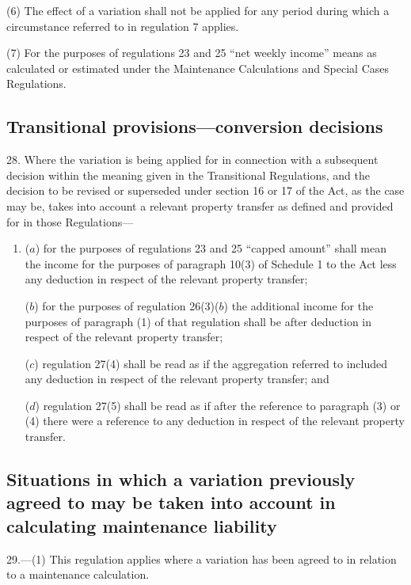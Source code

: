 \documentclass[12pt,a4paper]{article}
\begin{document}
(6) The effect of a variation shall not be applied for any period during which a circumstance referred to in regulation 7 applies.

(7) For the purposes of regulations 23 and 25 “net weekly income” means as calculated or estimated under the Maintenance Calculations and Special Cases Regulations.

\subsection[28. Transitional provisions—conversion decisions]{Transitional provisions—conversion decisions}

28.  Where the variation is being applied for in connection with a subsequent decision within the meaning given in the Transitional Regulations, and the decision to be revised or superseded under section 16 or 17 of the Act, as the case may be, takes into account a relevant property transfer as defined and provided for in those Regulations—
\begin{enumerate}\item[]
($a$) for the purposes of regulations 23 and 25 “capped amount” shall mean the income for the purposes of paragraph 10(3) of Schedule 1 to the Act less any deduction in respect of the relevant property transfer;

($b$) for the purposes of regulation 26(3)($b$)  the additional income for the purposes of paragraph (1) of that regulation shall be after deduction in respect of the relevant property transfer;

($c$) regulation 27(4) shall be read as if the aggregation referred to included any deduction in respect of the relevant property transfer; and

($d$) regulation 27(5) shall be read as if after the reference to paragraph (3) or (4) there were a reference to any deduction in respect of the relevant property transfer.
\end{enumerate}

\subsection[29. Situations in which a variation previously agreed to may be taken into account in calculating maintenance liability]{Situations in which a variation previously agreed to may be taken into account in calculating maintenance liability}

29.---(1)  This regulation applies where a variation has been agreed to in relation to a maintenance calculation.
\end{document}
